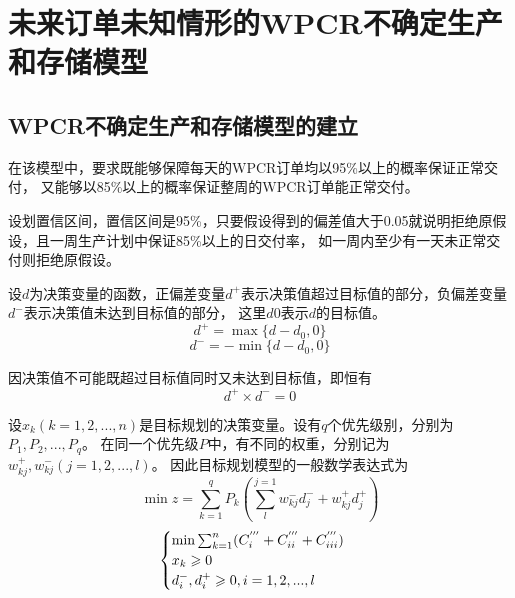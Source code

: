 %
%
%
%
%

\chapter{未来订单未知情形的WPCR不确定生产和存储模型}

\section{WPCR不确定生产和存储模型的建立}

在该模型中，要求既能够保障每天的WPCR订单均以95\%以上的概率保证正常交付，
又能够以85\%以上的概率保证整周的WPCR订单能正常交付。

设划置信区间，置信区间是95\%，只要假设得到的偏差值大于0.05就说明拒绝原假设，且一周生产计划中保证85\%以上的日交付率，
如一周内至少有一天未正常交付则拒绝原假设。

设$d$为决策变量的函数，正偏差变量$d^+$表示决策值超过目标值的部分，负偏差变量$d^-$表示决策值未达到目标值的部分，
这里$d0$表示$d$的目标值。
\begin{equation}
    d^+=\max\{d-d_0,0\}
\end{equation}
\begin{equation}
    d^-=-\min\{d-d_0,0\}
\end{equation}

因决策值不可能既超过目标值同时又未达到目标值，即恒有
\begin{equation}
    d^+ \times d^- = 0
\end{equation}

设$x_k(k=1,2,...,n)$是目标规划的决策变量。设有$q$个优先级别，分别为$P_1,P_2,...,P_q$。
在同一个优先级$P$中，有不同的权重，分别记为$w_{kj}^+, w_{kj}^-(j=1,2,...,l)$。
因此目标规划模型的一般数学表达式为
\begin{equation}
    \min z=\sum_{k=1}^{q}P_k(\sum_{l}^{j=1}w_{kj}^-d_{j}^- + w_{kj}^+d_{j}^+)
\end{equation}
\begin{equation}
    \begin{cases}
        \min\sum_{k=1}^{n}(
            C_{\uppercase\expandafter{\romannumeral1}}^{'''}+
            C_{\uppercase\expandafter{\romannumeral2}}^{'''}+
            C_{\uppercase\expandafter{\romannumeral3}}^{'''}) \\
        x_k \geqslant 0 \\
        d_i^-,d_i^+\geqslant 0,i=1,2,...,l
    \end{cases}
\end{equation}

